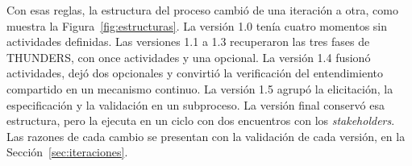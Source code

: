\documentclass[12pt,letterpaper,oneside]{report}
\begin{document}
Con esas reglas, la estructura del proceso cambió de una iteración a otra, como
muestra la Figura~\ref{fig:estructuras}. La versión 1.0 tenía cuatro momentos
sin actividades definidas. Las versiones 1.1 a 1.3 recuperaron las tres fases de
THUNDERS, con once actividades y una opcional. La versión 1.4 fusionó
actividades, dejó dos opcionales y convirtió la verificación del entendimiento compartido
en un mecanismo continuo. La versión 1.5 agrupó la elicitación, la
especificación y la validación en un subproceso. La versión final conservó esa
estructura, pero la ejecuta en un ciclo con dos encuentros con los
\textit{stakeholders}. Las razones de cada cambio se presentan con la
validación de cada versión, en la Sección~\ref{sec:iteraciones}.

\begin{figure}[H]
\centering
\begin{tikzpicture}[font=\tiny,
  every node/.append style={execute at begin node={\hyphenpenalty=10000\exhyphenpenalty=10000\relax}},
  bx/.style={draw=black!55, fill=white, rounded corners=1pt, text width=23.5mm, align=center, inner sep=1pt, minimum height=6.4mm},
  bo/.style={bx, dashed},
  bt/.style={bx, draw=devLine, fill=devFill, densely dotted},
  bs/.style={bx, draw=azulT, fill=azulT!8},
  cab/.style={text width=26.0mm, align=center, font=\scriptsize\bfseries},
  pie/.style={text width=26.0mm, align=center, font=\tiny, text=black!75}]


\end{tikzpicture}
\end{figure}
\end{document}
